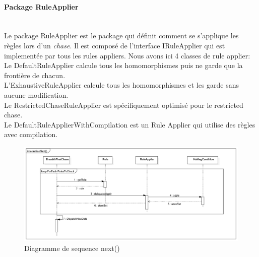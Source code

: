         \paragraph{Package RuleApplier}\ \\
        Le package RuleApplier est le package qui définit comment se s'applique les règles lors d'un \textit{chase}. Il est composé de l'interface IRuleApplier qui est implementée par tous les rules appliers. Nous avons ici 4 classes de rule applier:\\
        Le DefaultRuleApplier calcule tous les homomorphismes puis ne garde que la frontière de chacun.\\
        L'ExhaustiveRuleApplier calcule tous les homomorphismes et les garde sans aucune modification.\\
        Le RestrictedChaseRuleApplier est spécifiquement optimisé pour le restricted chase.\\
        Le DefaultRuleApplierWithCompilation est un Rule Applier qui utilise des règles avec compilation.
        
        
        \begin{figure}[H]
        \centering
        \includegraphics[width=\textwidth]{pictures/DiagrammeSequence.png}
        \caption{Diagramme de sequence next()}
        \label{fig:dsequence}
        \end{figure}
        
